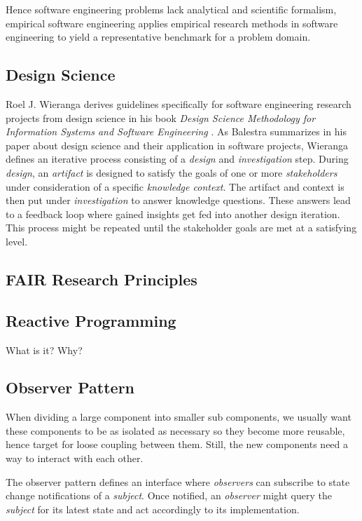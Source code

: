 \documentclass[12pt,a4paper]{article}
\begin{document}
Hence software engineering problems lack analytical and scientific formalism, empirical software engineering applies empirical research methods in software engineering to yield a representative benchmark for a problem domain.

\subsection{Design Science}

Roel J. Wieranga derives guidelines specifically for software engineering research projects from design science in his book \emph{Design Science Methodology for Information Systems and Software Engineering} \cite{wieringa}. As Balestra \cite{balestra:2019:designscience:articactandcontext} summarizes in his paper about design science and their application in software projects, Wieranga \cite{wieringa} defines an iterative process consisting of a \emph{design} and \emph{investigation} step. During \emph{design}, an \emph{artifact} is designed to satisfy the goals of one or more \emph{stakeholders} under consideration of a specific \emph{knowledge context}. The artifact and context is then put under \emph{investigation} to answer knowledge questions. These answers lead to a feedback loop where gained insights get fed into another design iteration. This process might be repeated until the stakeholder goals are met at a satisfying level.

\subsection{FAIR Research Principles}

\subsection{Reactive Programming}
What is it? Why?

\subsection{Observer Pattern}
When dividing a large component into smaller sub components, we usually want these components to be as isolated as necessary so they become more reusable, hence target for loose coupling between them. Still, the new components need a way to interact with each other.

The observer pattern \cite{gamma1995design} defines an interface where \emph{observers} can subscribe to state change notifications of a \emph{subject}. Once notified, an \emph{observer} might query the \emph{subject} for its latest state and act accordingly to its implementation.
\end{document}
